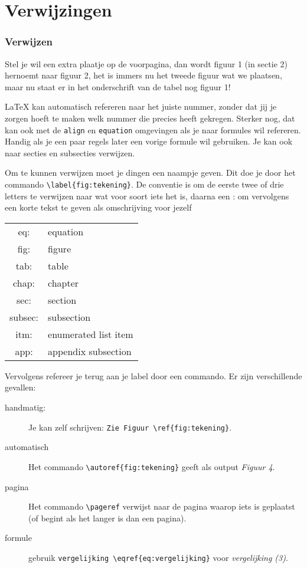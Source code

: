 \documentclass{beamer}
\begin{document}
\section{Verwijzingen}
\begin{frame}[allowframebreaks]
	\frametitle{Verwijzen}
	Stel je wil een extra plaatje op de voorpagina, dan wordt figuur 1 (in sectie 2) hernoemt naar figuur 2, het is immers nu het tweede figuur wat we plaatsen, maar nu staat er in het onderschrift van de tabel nog figuur 1!
	
	\LaTeX{} kan automatisch refereren naar het juiste nummer, zonder dat jij je zorgen hoeft te maken welk nummer die precies heeft gekregen. Sterker nog, dat kan ook met de \texttt{align} en \texttt{equation} omgevingen als je naar formules wil refereren. Handig als je een paar regels later een vorige formule wil gebruiken. Je kan ook naar secties en subsecties verwijzen.
	
	\framebreak
	
	Om te kunnen verwijzen moet je dingen een naampje geven. Dit doe je door het commando \alert{\texttt{\textbackslash label\{fig:tekening\}}}. De conventie is om de eerste twee of drie letters te verwijzen naar wat voor soort iets het is, daarna een : om vervolgens een korte tekst te geven als omschrijving voor jezelf
	
	\begin{table}
		\centering
		\begin{tabular}{c|l}
			eq:&	equation \\ 
			fig:&	figure \\
			tab:&	table \\
			chap: &	chapter \\
			sec:&	section \\
			subsec:&	subsection \\
			itm:&	enumerated list item \\
			app:&	appendix subsection
		\end{tabular}
	\end{table}

	\framebreak
	Vervolgens refereer je terug aan je label door een commando. Er zijn verschillende gevallen:
	\begin{description}
		\item[handmatig:] Je kan zelf schrijven: \texttt{Zie Figuur \textbackslash ref\{fig:tekening\}}.
		\item[automatisch] Het commando \texttt{\textbackslash autoref\{fig:tekening\}} geeft als output \textit{Figuur 4}. 
		\item[pagina]  Het commando \texttt{\textbackslash pageref} verwijst naar de pagina waarop iets is geplaatst (of begint als het langer is dan een pagina).
		\item[formule] gebruik \texttt{vergelijking \textbackslash eqref\{eq:vergelijking\}} voor \textit{vergelijking (3)}.
	\end{description}
\end{frame}
	
\end{document}
